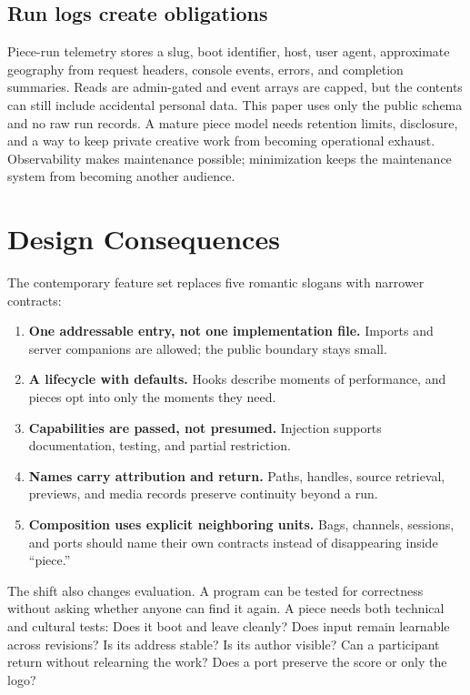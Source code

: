 \documentclass[10pt,letterpaper,twocolumn]{article}
\begin{document}
\subsection{Run logs create obligations}

Piece-run telemetry stores a slug, boot identifier, host, user agent, approximate geography from request headers, console events, errors, and completion summaries. Reads are admin-gated and event arrays are capped, but the contents can still include accidental personal data. This paper uses only the public schema and no raw run records. A mature piece model needs retention limits, disclosure, and a way to keep private creative work from becoming operational exhaust. Observability makes maintenance possible; minimization keeps the maintenance system from becoming another audience.

\section{Design Consequences}

The contemporary feature set replaces five romantic slogans with narrower contracts:

\begin{enumerate}
  \item \textbf{One addressable entry, not one implementation file.} Imports and server companions are allowed; the public boundary stays small.
  \item \textbf{A lifecycle with defaults.} Hooks describe moments of performance, and pieces opt into only the moments they need.
  \item \textbf{Capabilities are passed, not presumed.} Injection supports documentation, testing, and partial restriction.
  \item \textbf{Names carry attribution and return.} Paths, handles, source retrieval, previews, and media records preserve continuity beyond a run.
  \item \textbf{Composition uses explicit neighboring units.} Bags, channels, sessions, and ports should name their own contracts instead of disappearing inside ``piece.''
\end{enumerate}

The shift also changes evaluation. A program can be tested for correctness without asking whether anyone can find it again. A piece needs both technical and cultural tests: Does it boot and leave cleanly? Does input remain learnable across revisions? Is its address stable? Is its author visible? Can a participant return without relearning the work? Does a port preserve the score or only the logo?
\end{document}
